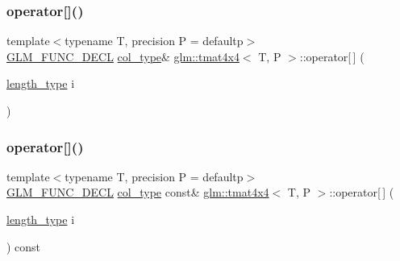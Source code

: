 \mbox{\label{structglm_1_1tmat4x4_a4be08a6a3f8cb1f0954c2d0347961582}} 
\subsubsection{\texorpdfstring{operator[]()}{operator[]()}\hspace{0.1cm}{\footnotesize\ttfamily [1/2]}}
{\footnotesize\ttfamily template$<$typename T, precision P = defaultp$>$ \\
\mbox{\hyperlink{setup_8hpp_ab2d052de21a70539923e9bcbf6e83a51}{G\+L\+M\+\_\+\+F\+U\+N\+C\+\_\+\+D\+E\+CL}} \mbox{\hyperlink{structglm_1_1tmat4x4_ac879ae9669b754551245231ee992a1ea}{col\+\_\+type}}\& \mbox{\hyperlink{structglm_1_1tmat4x4}{glm\+::tmat4x4}}$<$ T, P $>$\+::operator\mbox{[}$\,$\mbox{]} (\begin{DoxyParamCaption}\item[{\mbox{\hyperlink{structglm_1_1tmat4x4_aff2734210dc0f3c3c60c49bb1f3e8864}{length\+\_\+type}}}]{i }\end{DoxyParamCaption})}

\mbox{\label{structglm_1_1tmat4x4_a0b1cbaaefe0ad2cb8f7047e957e58841}} 
\subsubsection{\texorpdfstring{operator[]()}{operator[]()}\hspace{0.1cm}{\footnotesize\ttfamily [2/2]}}
{\footnotesize\ttfamily template$<$typename T, precision P = defaultp$>$ \\
\mbox{\hyperlink{setup_8hpp_ab2d052de21a70539923e9bcbf6e83a51}{G\+L\+M\+\_\+\+F\+U\+N\+C\+\_\+\+D\+E\+CL}} \mbox{\hyperlink{structglm_1_1tmat4x4_ac879ae9669b754551245231ee992a1ea}{col\+\_\+type}} const\& \mbox{\hyperlink{structglm_1_1tmat4x4}{glm\+::tmat4x4}}$<$ T, P $>$\+::operator\mbox{[}$\,$\mbox{]} (\begin{DoxyParamCaption}\item[{\mbox{\hyperlink{structglm_1_1tmat4x4_aff2734210dc0f3c3c60c49bb1f3e8864}{length\+\_\+type}}}]{i }\end{DoxyParamCaption}) const}



